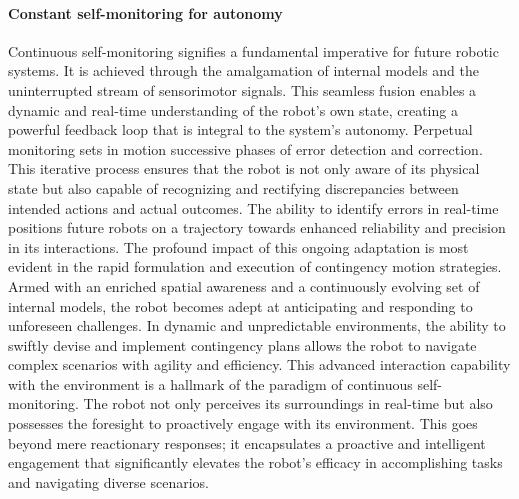 \paragraph*{Constant self-monitoring for autonomy} Continuous self-monitoring signifies a fundamental imperative for future robotic systems. It is achieved through the amalgamation of internal models and the uninterrupted stream of sensorimotor signals. This seamless fusion enables a dynamic and real-time understanding of the robot's own state, creating a powerful feedback loop that is integral to the system's autonomy. Perpetual monitoring sets in motion successive phases of error detection and correction. This iterative process ensures that the robot is not only aware of its physical state but also capable of recognizing and rectifying discrepancies between intended actions and actual outcomes. The ability to identify errors in real-time positions future robots on a trajectory towards enhanced reliability and precision in its interactions. The profound impact of this ongoing adaptation is most evident in the rapid formulation and execution of contingency motion strategies. Armed with an enriched spatial awareness and a continuously evolving set of internal models, the robot becomes adept at anticipating and responding to unforeseen challenges. In dynamic and unpredictable environments, the ability to swiftly devise and implement contingency plans allows the robot to navigate complex scenarios with agility and efficiency. This advanced interaction capability with the environment is a hallmark of the paradigm of continuous self-monitoring. The robot not only perceives its surroundings in real-time but also possesses the foresight to proactively engage with its environment. This goes beyond mere reactionary responses; it encapsulates a proactive and intelligent engagement that significantly elevates the robot's efficacy in accomplishing tasks and navigating diverse scenarios.

